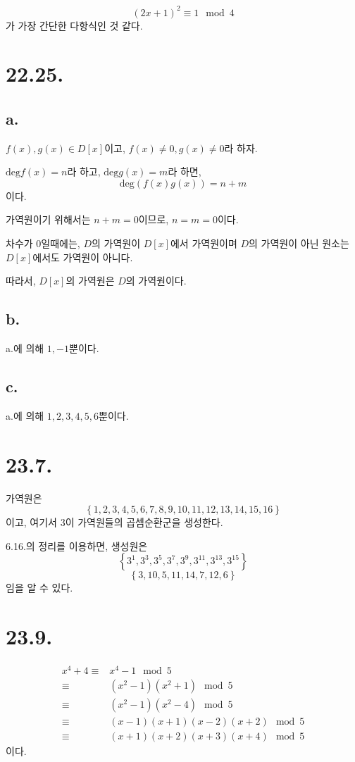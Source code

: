 \documentclass{article}
\begin{document}
$$(2x+1)^2 \equiv 1 \mod 4$$가 가장 간단한 다항식인 것 같다.

\section{22.25.}
\subsection{a.}
$f(x), g(x) \in D[x]$이고, $f(x) \neq 0, g(x) \neq 0$라 하자.

$\text{deg} f(x) = n$라 하고, $\text{deg} g(x) = m$라 하면,
$$\text{deg} (f(x)g(x)) = n+m$$이다.

가역원이기 위해서는 $n+m = 0$이므로, $n = m = 0$이다.

차수가 $0$일때에는, $D$의 가역원이 $D[x]$에서 가역원이며 $D$의 가역원이 아닌 원소는 $D[x]$에서도 가역원이 아니다.

따라서, $D[x]$의 가역원은 $D$의 가역원이다.
\subsection{b.}
a.에 의해 $1, -1$뿐이다.
\subsection{c.}
a.에 의해 $1, 2, 3, 4, 5, 6$뿐이다.

\section{23.7.}
가역원은
$$\left\{1, 2, 3, 4, 5, 6, 7, 8, 9, 10, 11, 12, 13, 14, 15, 16\right\}$$
이고, 여기서 $3$이 가역원들의 곱셈순환군을 생성한다.

6.16.의 정리를 이용하면, 생성원은
$$\left\{3^1, 3^3, 3^5, 3^7, 3^9, 3^11, 3^13, 3^15\right\}$$
$$\left\{3, 10, 5, 11, 14, 7, 12, 6\right\}$$
임을 알 수 있다.

\section{23.9.}
\begin{align*}
x^4 + 4 \equiv& x^4 - 1 \mod 5
\\ \equiv& (x^2 - 1)(x^2 + 1) \mod 5
\\ \equiv& (x^2 - 1)(x^2 - 4) \mod 5
\\ \equiv& (x-1)(x+1)(x-2)(x+2) \mod 5
\\ \equiv& (x+1)(x+2)(x+3)(x+4) \mod 5
\end{align*}
이다.
\end{document}
